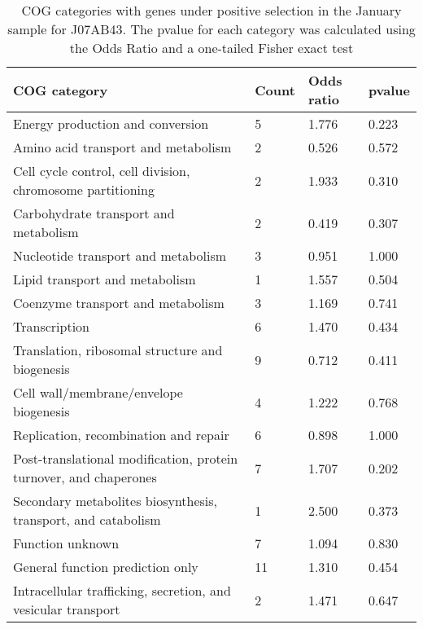 \begin{table}[]
\footnotesize 
	\tabcolsep=0.11cm 
\caption{COG categories with genes under positive selection in the January sample for J07AB43. The pvalue for each category was calculated using the Odds Ratio and a one-tailed Fisher exact test \\} 
\begin{tabularx}{\textwidth}{L{6cm}R{2cm}R{2cm}R{2cm}} 
\hline 
\textbf{COG category} & \textbf{Count} & \textbf{Odds ratio} & \textbf{pvalue} \\ 
\hline 
Energy production and conversion & 5 & 1.776 & 0.223 \\ 
Amino acid transport and metabolism & 2 & 0.526 & 0.572 \\ 
Cell cycle control, cell division, chromosome partitioning & 2 & 1.933 & 0.310 \\ 
Carbohydrate transport and metabolism & 2 & 0.419 & 0.307 \\ 
Nucleotide transport and metabolism & 3 & 0.951 & 1.000 \\ 
Lipid transport and metabolism & 1 & 1.557 & 0.504 \\ 
Coenzyme transport and metabolism & 3 & 1.169 & 0.741 \\ 
Transcription & 6 & 1.470 & 0.434 \\ 
Translation, ribosomal structure and biogenesis & 9 & 0.712 & 0.411 \\ 
Cell wall/membrane/envelope biogenesis & 4 & 1.222 & 0.768 \\ 
Replication, recombination and repair & 6 & 0.898 & 1.000 \\ 
Post-translational modification, protein turnover, and chaperones & 7 & 1.707 & 0.202 \\ 
Secondary metabolites biosynthesis, transport, and catabolism & 1 & 2.500 & 0.373 \\ 
Function unknown & 7 & 1.094 & 0.830 \\ 
General function prediction only & 11 & 1.310 & 0.454 \\ 
Intracellular trafficking, secretion, and vesicular transport & 2 & 1.471 & 0.647 \\ 
\end{tabularx} 
\label{January_COG_Selection_J07AB43} 
 \end{table} 

